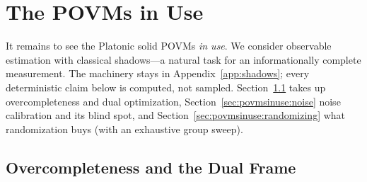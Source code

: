 \documentclass[11pt, oneside, openany]{scrbook}
\begin{document}
\section{The POVMs in Use} \label{sec:povmsinuse}


It remains to see the Platonic solid POVMs \textit{in use}. We consider observable estimation with classical shadows---a natural task for an informationally complete measurement. The machinery stays in Appendix~\ref{app:shadows}; every deterministic claim below is computed, not sampled. Section~\ref{sec:povmsinuse:frames} takes up overcompleteness and dual optimization, Section~\ref{sec:povmsinuse:noise} noise calibration and its blind spot, and Section~\ref{sec:povmsinuse:randomizing} what randomization buys (with an exhaustive group sweep).

\subsection{Overcompleteness and the Dual Frame} \label{sec:povmsinuse:frames}
\end{document}

